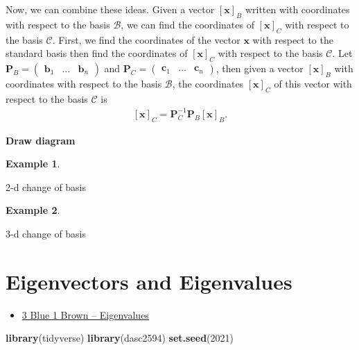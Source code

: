 \documentclass[
]{book}
\newenvironment{Shaded}{\begin{snugshade}}{\end{snugshade}}
\newcommand{\DecValTok}[1]{\textcolor[rgb]{0.00,0.00,0.81}{#1}}
\newcommand{\KeywordTok}[1]{\textcolor[rgb]{0.13,0.29,0.53}{\textbf{#1}}}
\newcommand{\NormalTok}[1]{#1}
\providecommand{\tightlist}{%
  \setlength{\itemsep}{0pt}\setlength{\parskip}{0pt}}
\theoremstyle{definition}
\theoremstyle{definition}
\newtheorem{example}{Example}[chapter]
\theoremstyle{definition}
\theoremstyle{remark}
\begin{document}
Now, we can combine these ideas. Given a vector \([\mathbf{x}]_B\) written with coordinates with respect to the basis \(\mathcal{B}\), we can find the coordinates of \([\mathbf{x}]_C\) with respect to the basis \(\mathcal{C}\). First, we find the coordinates of the vector \(\mathbf{x}\) with respect to the standard basis then find the coordinates of \([\mathbf{x}]_C\) with respect to the basis \(\mathcal{C}\). Let \(\mathbf{P}_B = \begin{pmatrix} \mathbf{b}_1 & \ldots & \mathbf{b}_n \end{pmatrix}\) and \(\mathbf{P}_C = \begin{pmatrix} \mathbf{c}_1 & \ldots & \mathbf{c}_n \end{pmatrix}\), then given a vector \([\mathbf{x}]_B\) with coordinates with respect to the basis \(\mathcal{B}\), the coordinates \([\mathbf{x}]_C\) of this vector with respect to the basis \(\mathcal{C}\) is
\[
\begin{aligned}
[\mathbf{x}]_C = \mathbf{P}_C^{-1} \mathbf{P}_B [\mathbf{x}]_B.
\end{aligned}
\]

\textbf{Draw diagram}

\begin{example}
\protect\hypertarget{exm:unlabeled-div-156}{}\label{exm:unlabeled-div-156}

2-d change of basis

\end{example}

\begin{example}
\protect\hypertarget{exm:unlabeled-div-157}{}\label{exm:unlabeled-div-157}

3-d change of basis

\end{example}

\hypertarget{eigenvectors-and-eigenvalues}{%
\chapter{Eigenvectors and Eigenvalues}\label{eigenvectors-and-eigenvalues}}

\begin{itemize}
\tightlist
\item
  \href{https://www.3blue1brown.com/lessons/eigenvalues}{3 Blue 1 Brown -- Eigenvalues}
\end{itemize}

\begin{Shaded}
\begin{Highlighting}[]
\KeywordTok{library}\NormalTok{(tidyverse)}
\KeywordTok{library}\NormalTok{(dasc2594)}
\KeywordTok{set.seed}\NormalTok{(}\DecValTok{2021}\NormalTok{)}
\end{Highlighting}
\end{Shaded}
\end{document}
